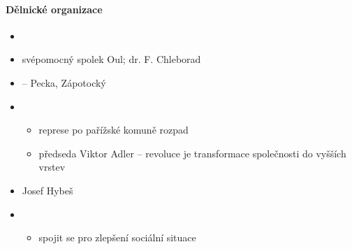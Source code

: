 \paragraph{Dělnické organizace}
\begin{itemize}
\item {}
\item svépomocný spolek Oul; dr. F. Chleborad
\item {} -- Pecka, Zápotocký
\item {}
	\begin{itemize}
	\item represe po pařížské komuně \ra rozpad
	\item předseda Viktor Adler -- revoluce je transformace společnosti do vyšších vrstev
	\end{itemize}
\item Josef Hybeš
\item {}
	\begin{itemize}
	\item spojit se pro zlepšení sociální situace
	\end{itemize}
\end{itemize}

